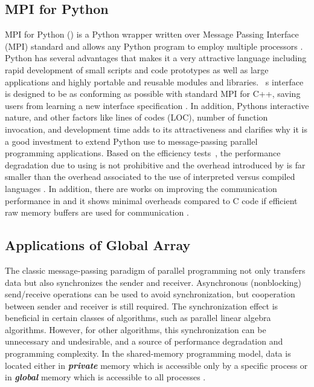 \label{background}

\subsection{MPI for Python }
MPI for Python () is a Python wrapper written over Message Passing Interface (MPI) standard and allows any Python program to employ multiple processors \cite{Dalcin:2011aa, Dalcin:2005aa}.
Python has several advantages that makes it a very attractive language including rapid development of small scripts and code prototypes as well as large applications and highly portable and reusable modules and libraries.~
\textsc{}s interface is designed to be as conforming as possible with standard MPI for C++, saving users from learning a new interface specification \cite{GAiN}. 
In addition, Python\textsc{}s interactive nature, and other factors like lines of codes (LOC), number of function invocation, and development time adds to its attractiveness and clarifies why it is a good investment to extend Python use to message-passing parallel programming applications.
Based on the efficiency tests~, the performance degradation due to using  is not prohibitive and the overhead introduced by  is far smaller than the overhead associated to the use of interpreted versus compiled languages \cite{GAiN}.
In addition, there are works on improving the communication performance in  and it shows minimal overheads compared to C code if efficient raw memory buffers are used for communication \cite{Dalcin:2011aa}.

\subsection{Applications of Global Array}
The classic message-passing paradigm of parallel programming not only transfers data but also synchronizes the sender and receiver. 
Asynchronous (nonblocking) send/receive operations can be used to avoid synchronization, but cooperation between sender and receiver is still required. 
The synchronization effect is beneficial in certain classes of algorithms, such as parallel linear algebra algorithms.
However, for other algorithms, this synchronization can be unnecessary and undesirable, and a source of performance degradation and programming complexity. 
In the shared-memory programming model, data is located either in \textbf{\textit{private}} memory which is accessible only by a specific process or in \textbf{\textit{global}} memory which is accessible to all processes \cite{GA}. 

